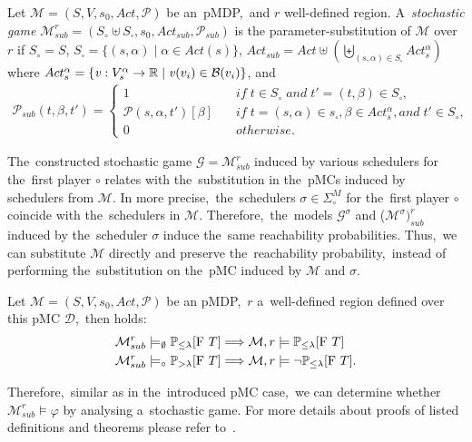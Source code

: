 \begin{definition} \label{def:sub_mdp}
Let $\mathcal{M} = (S, V, s_0, Act, \mathcal{P})$ be an~pMDP,~and $r$ well-defined region.
A~\textit{stochastic game} $\mathcal{M}_{sub}^r = (S_{\circ} \uplus S_{\square}, s_0, Act_{sub}, \mathcal{P}_{sub})$ is the parameter-substitution of $\mathcal{M}$ over $r$ if $S_{\circ} = S$, $S_{\square} = \{ (s, \alpha) \; \lvert \; \alpha \in Act(s) \}$, $Act_{sub} = Act \uplus (\biguplus_{(s, \alpha) \in S_{\square}}Act_s^\alpha)$ where $Act_s^\alpha = \{\mathit{v}: V_s^\alpha \rightarrow \mathbb{R} \; \lvert \; \mathit{v}(v_i) \in \mathcal{B}(v_i) \}$, and
\begin{align*}
    \mathcal{P}_{sub}(t, \beta, t') = 
    \begin{cases}
        1 \quad & if \; t \in S_\circ \; and \; t' = (t, \beta) \in S_\square, \\
        \mathcal{P}(s, \alpha, t')[\beta] \quad & if \; t = (s, \alpha) \in s_\square, \beta \in Act_s^\alpha, and \; t' \in S_\circ, \\
        0 \quad & otherwise.
    \end{cases}
\end{align*}
\end{definition}
\noindent
The~constructed stochastic game $\mathcal{G} = \mathcal{M}_{sub}^r$ induced by various schedulers for the~first player $\circ$ relates with the~substitution in the~pMCs induced by schedulers from $\mathcal{M}$. 
In more precise,~the~schedulers $\sigma \in \Sigma^M_\circ$ for the~first player $\circ$ coincide with the~schedulers in $\mathcal{M}$.
Therefore,~the~models $\mathcal{G}^\sigma$ and ($\mathcal{M}^\sigma)_{sub}^r$ induced by the~scheduler $\sigma$ induce the~same reachability probabilities.
Thus,~we can substitute $\mathcal{M}$ directly and preserve the~reachability probability,~instead of performing the~substitution on the~pMC induced by $\mathcal{M}$ and $\sigma$.

\begin{theorem} \label{the:mdp_stochastic}
Let $\mathcal{M} = (S, V, s_0, Act, \mathcal{P})$ be an pMDP,~$r$ a~well-defined region defined over this pMC $\mathcal{D}$,~then holds:
\begin{align*}
    \mathcal{M}_{sub}^{r} \models_{\emptyset} \mathbb{P}_{\leq \lambda}[\mathrm{F}\ T] \Longrightarrow \mathcal{M}, r \models & \; \mathbb{P}_{\leq \lambda}[\mathrm{F}\ T] \\
    \mathcal{M}_{sub}^{r} \models_{\circ} \mathbb{P}_{> \lambda}[\mathrm{F}\ T] \Longrightarrow \mathcal{M}, r \models & \; \neg\mathbb{P}_{\leq \lambda}[\mathrm{F}\ T].
\end{align*}
\end{theorem}
\noindent
Therefore,~similar as in the~introduced pMC case,~we can determine whether $\mathcal{M}_{sub}^r \models \varphi$ by analysing a~stochastic game.
For more details about proofs of listed definitions and theorems please refer to~\cite{Quatmann2016}.



